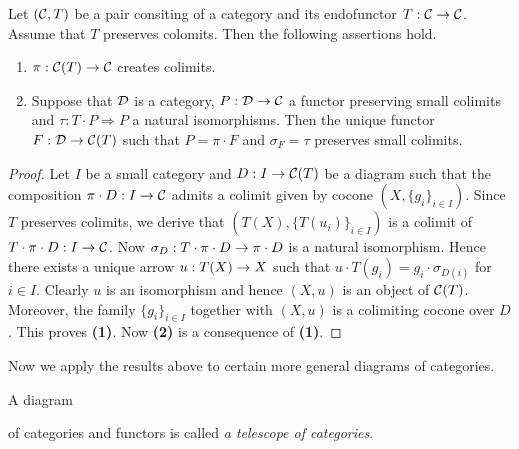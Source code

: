 \begin{theorem}\label{theorem:endoscope_colimits}
Let $({\mathcal C},T)$ be a pair consiting of a category and its endofunctor $T:{\mathcal C}\rightarrow {\mathcal C}$. Assume that $T$ preserves colomits. Then the following assertions hold.
\begin{enumerate}[label=\textbf{\emph{(\arabic*)}}, leftmargin=3.0em]
\item $\pi:{\mathcal C}(T)\rightarrow {\mathcal C}$ creates colimits.
\item Suppose that ${\mathcal D}$ is a category, $P:{\mathcal D}\rightarrow {\mathcal C}$ a functor preserving small colimits and $\tau:T\cdot P \Rightarrow P$ a natural isomorphisms. Then the unique functor $F:{\mathcal D} \rightarrow {\mathcal C}(T)$ such that $P = \pi\cdot F$ and $\sigma_F = \tau$ preserves small colimits.
\end{enumerate}
\end{theorem}
\begin{proof}
Let $I$ be a small category and $D:I\rightarrow {\mathcal C}(T)$ be a diagram such that the composition $\pi\cdot D:I\rightarrow {\mathcal C}$ admits a colimit given by cocone $(X,\{g_i\}_{i\in I})$. Since $T$ preserves colimits, we derive that $\left(T(X), \{T(u_i)\}_{i\in I}\right)$ is a colimit of $T\cdot \pi \cdot D:I\rightarrow {\mathcal C}$. Now $\sigma_D:T\cdot \pi\cdot D\rightarrow \pi\cdot D$ is a natural isomorphism. Hence there exists a unique arrow $u:T(X)\rightarrow X$ such that $u \cdot T(g_i) = g_i\cdot \sigma_{D(i)}$ for $i\in I$. Clearly $u$ is an isomorphism and hence $(X,u)$ is an object of ${\mathcal C}(T)$. Moreover, the family $\{g_i\}_{i\in I}$ together with $(X,u)$ is a colimiting cocone over $D$. This proves \textbf{(1)}. Now \textbf{(2)} is a consequence of \textbf{(1)}.
\end{proof}
\noindent
Now we apply the results above to certain more general diagrams of categories.

\begin{definition}
A diagram
\begin{center}   
\end{center}
of categories and functors is called \textit{a telescope of categories}.
\end{definition}

